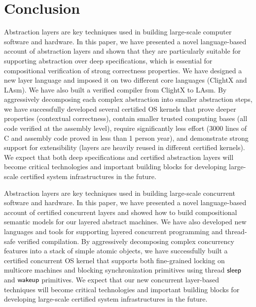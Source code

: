 \chapter{Conclusion}
\label{chap-concl}

Abstraction layers are key techniques used in building large-scale
computer software and hardware. In this paper, we have presented a
novel language-based account of abstraction layers and shown that they
are particularly suitable for supporting abstraction over deep
specifications, which is essential for compositional verification of
strong correctness properties. We have designed a new layer language
and imposed it on two different core languages (ClightX and LAsm). We
have also built a verified compiler from ClightX to LAsm. By
aggressively decomposing each complex abstraction into smaller
abstraction steps, we have successfully developed several certified OS
kernels that prove deeper properties (contextual correctness), contain
smaller trusted computing bases (all code verified at the assembly
level), require significantly less effort (3000 lines of C and
assembly code proved in less than 1 person year), and demonstrate
strong support for extensibility (layers are heavily reused in
different certified kernels). We expect that both deep specifications
and certified abstraction layers will become critical technologies and
important building blocks for developing large-scale certified system
infrastructures in the future.



Abstraction layers are key techniques used in building large-scale
concurrent software and hardware. In this paper, we have presented a
novel language-based account of certified concurrent layers and showed
how to build compositional semantic models for our layered abstract
machines. We have also developed new languages and tools for
supporting layered concurrent programming and thread-safe verified
compilation.  By aggressively decomposing complex concurrency features
into a stack of simple atomic objects, we have successfully built a
certified concurrent OS kernel that supports both fine-grained locking
on multicore machines and blocking synchronization primitives using
thread $\mathsf{sleep}$ and $\mathsf{wakeup}$ primitives. We expect that our new concurrent
layer-based techniques will become critical technologies and important
building blocks for developing large-scale certified system
infrastructures in the future.